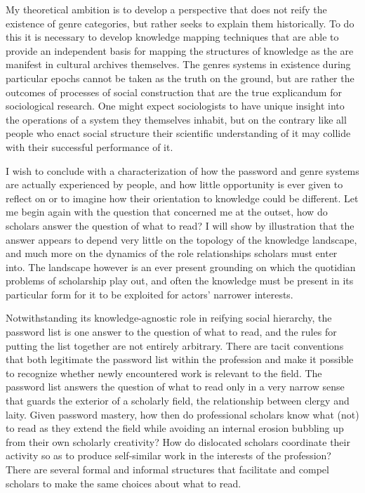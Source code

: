 \documentclass[]{book}
\theoremstyle{definition}
\theoremstyle{definition}
\theoremstyle{definition}
\theoremstyle{remark}
\begin{document}
My theoretical ambition is to develop a perspective that does not reify
the existence of genre categories, but rather seeks to explain them
historically. To do this it is necessary to develop knowledge mapping
techniques that are able to provide an independent basis for mapping the
structures of knowledge as the are manifest in cultural archives
themselves. The genres systems in existence during particular epochs
cannot be taken as the truth on the ground, but are rather the outcomes
of processes of social construction that are the true explicandum for
sociological research. One might expect sociologists to have unique
insight into the operations of a system they themselves inhabit, but on
the contrary like all people who enact social structure their scientific
understanding of it may collide with their successful performance of it.

I wish to conclude with a characterization of how the password and genre
systems are actually experienced by people, and how little opportunity
is ever given to reflect on or to imagine how their orientation to
knowledge could be different. Let me begin again with the question that
concerned me at the outset, how do scholars answer the question of what
to read? I will show by illustration that the answer appears to depend
very little on the topology of the knowledge landscape, and much more on
the dynamics of the role relationships scholars must enter into. The
landscape however is an ever present grounding on which the quotidian
problems of scholarship play out, and often the knowledge must be
present in its particular form for it to be exploited for actors'
narrower interests.

Notwithstanding its knowledge-agnostic role in reifying social
hierarchy, the password list is one answer to the question of what to
read, and the rules for putting the list together are not entirely
arbitrary. There are tacit conventions that both legitimate the password
list within the profession and make it possible to recognize whether
newly encountered work is relevant to the field. The password list
answers the question of what to read only in a very narrow sense that
guards the exterior of a scholarly field, the relationship between
clergy and laity. Given password mastery, how then do professional
scholars know what (not) to read as they extend the field while avoiding
an internal erosion bubbling up from their own scholarly creativity? How
do dislocated scholars coordinate their activity so as to produce
self-similar work in the interests of the profession? There are several
formal and informal structures that facilitate and compel scholars to
make the same choices about what to read.
\end{document}
